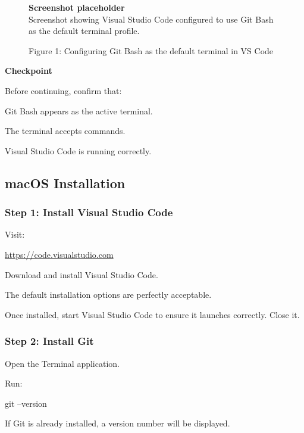 \documentclass{csc2059practical}
\begin{document}
\begin{figure}[htbp]
\centering
\begin{tcolorbox}[
  enhanced,
  colback=CSCGray,
  colframe=CSCBlue!45!black,
  boxrule=0.6pt,
  arc=2mm,
  width=0.9\linewidth,
  left=5mm,right=5mm,top=5mm,bottom=5mm,
  halign=center
]
{\sffamily\bfseries Screenshot placeholder}\\[2mm]
{\small Screenshot showing Visual Studio Code configured to use Git Bash as the default terminal profile.}
\end{tcolorbox}
\caption{Figure 1: Configuring Git Bash as the default terminal in VS Code}
\end{figure}
\begin{reflectionbox}
\textbf{Checkpoint}\par
\medskip

Before continuing, confirm that:


Git Bash appears as the active terminal.


The terminal accepts commands.


Visual Studio Code is running correctly.


\end{reflectionbox}
\subsection{macOS Installation}
\subsubsection{Step 1: Install Visual Studio Code}
Visit:

\href{https://code.visualstudio.com}{https://code.visualstudio.com}

Download and install Visual Studio Code.

The default installation options are perfectly acceptable.

Once installed, start Visual Studio Code to ensure it launches correctly. Close it.

\subsubsection{Step 2: Install Git}
Open the Terminal application.

Run:

\begin{terminalplain}
git --version
\end{terminalplain}
If Git is already installed, a version number will be displayed.
\end{document}
